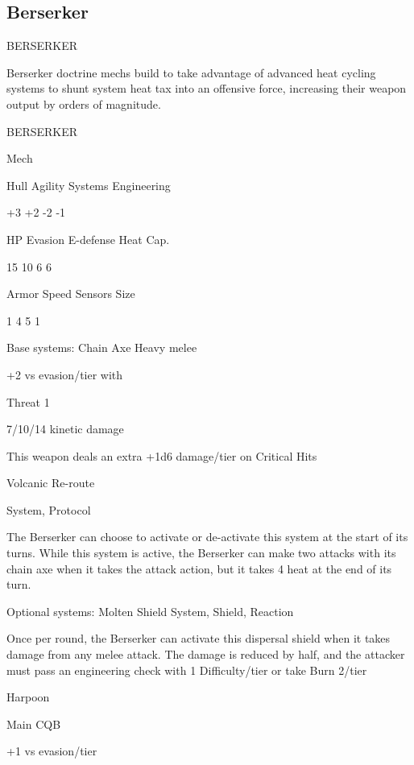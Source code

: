 \subsection{Berserker}
                                            BERSERKER  

Berserker doctrine mechs build to take advantage of advanced heat cycling systems to shunt  
system heat tax into an offensive force, increasing their weapon output by orders of magnitude.   

       BERSERKER 

       Mech 

       Hull      Agility      Systems       Engineering 

       +3         +2          -2            -1 

       HP         Evasion     E-defense     Heat Cap. 

       15         10          6             6 

       Armor     Speed        Sensors       Size 

       1          4           5             1 

Base systems:  
Chain Axe  
Heavy melee
 
+2 vs evasion/tier with
 
Threat 1
 
7/10/14 kinetic damage
 
This weapon deals an extra +1d6 damage/tier on Critical Hits
 

Volcanic Re-route
 
System, Protocol
 
The Berserker can choose to activate or de-activate this system at the start of its turns. While  
this system is active, the Berserker can make two attacks with its chain axe when it takes the  
attack action, but it takes 4 heat at the end of its turn.
 

Optional systems:  
Molten Shield  
System, Shield, Reaction
 
Once per round, the Berserker can activate this dispersal shield when it takes damage from any  
melee attack. The damage is reduced by half, and the attacker must pass an engineering check  
with 1 Difficulty/tier or take Burn 2/tier
 

Harpoon 
 
Main CQB
 
+1 vs evasion/tier
 

                                                                                                         


